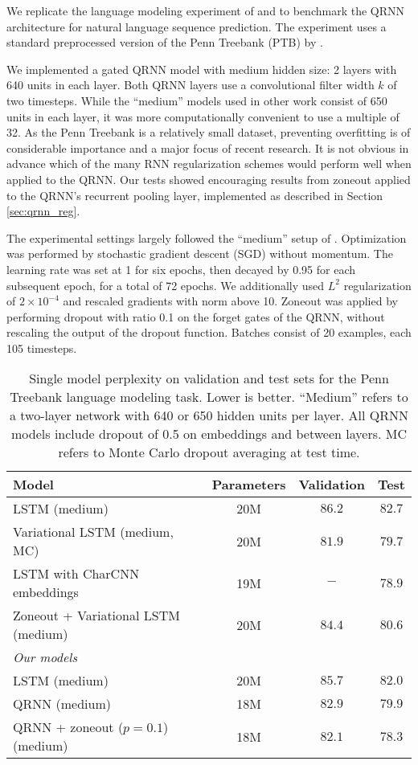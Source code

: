\documentclass{article} \usepackage{iclr2017_conference,times}
\begin{document}
We replicate the language modeling experiment of \citet{Zaremba2014} and \citet{Gal2015} to benchmark the QRNN architecture for natural language sequence prediction.
The experiment uses a standard preprocessed version of the Penn Treebank (PTB) by \citet{Mikolov2010}.

We implemented a gated QRNN model with medium hidden size: 2 layers with 640 units in each layer. Both QRNN layers use a convolutional filter width $k$ of two timesteps.
While the ``medium'' models used in other work \citep{Zaremba2014,Gal2015} consist of 650 units in each layer, it was more computationally convenient to use a multiple of 32.
As the Penn Treebank is a relatively small dataset, preventing overfitting is of considerable importance and a major focus of recent research.
It is not obvious in advance which of the many RNN regularization schemes would perform well when applied to the QRNN.
Our tests showed encouraging results from zoneout applied to the QRNN's recurrent pooling layer, implemented as described in Section \ref{sec:qrnn_reg}.

The experimental settings largely followed the ``medium'' setup of \citet{Zaremba2014}.
Optimization was performed by stochastic gradient descent (SGD) without momentum. The learning rate was set at 1 for six epochs, then decayed by 0.95 for each subsequent epoch, for a total of 72 epochs.
We additionally used $L^2$ regularization of $2\times 10^{-4}$ and rescaled gradients with norm above 10.
Zoneout was applied by performing dropout with ratio 0.1 on the forget gates of the QRNN, without rescaling the output of the dropout function.
Batches consist of 20 examples, each 105 timesteps.

\begin{table*}[b]
\centering
\small
\begin{tabular}{l|ccc}
\toprule
\bf Model & \bf Parameters & \bf Validation &  \bf Test \\
\midrule
LSTM (medium) \citep{Zaremba2014} & 20M & $86.2$ & $82.7$ \\
Variational LSTM (medium, MC) \citep{Gal2015} & 20M & $81.9$ & $79.7$ \\
LSTM with CharCNN embeddings \citep{Kim2016} & 19M & $-$ & $78.9$ \\
Zoneout + Variational LSTM (medium) \citep{Merity2016} & 20M & $84.4$ & $80.6$ \\
\midrule
{\it Our models}\\
LSTM (medium) & 20M & $85.7$ & $82.0$ \\
QRNN (medium) & 18M & $82.9$ & $79.9$ \\
QRNN + zoneout ($p=0.1$) (medium) & 18M & $82.1$ & $78.3$ \\
\bottomrule
\end{tabular}
\caption{
Single model perplexity on validation and test sets for the Penn Treebank language modeling task. Lower is better.
``Medium'' refers to a two-layer network with 640 or 650 hidden units per layer. All QRNN models include dropout of 0.5 on embeddings and between layers.
MC refers to Monte Carlo dropout averaging at test time.
}
\label{table:PTBresults}
\end{table*}
\end{document}
